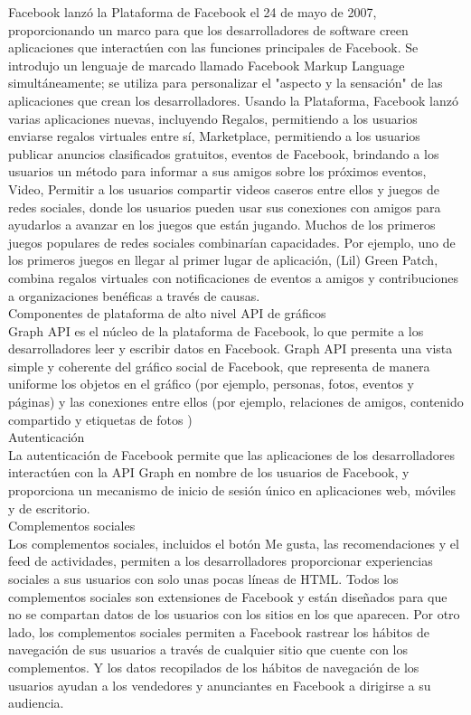 \begin{itemize}
		Facebook lanzó la Plataforma de Facebook el 24 de mayo de 2007, proporcionando un marco para que los desarrolladores de software creen aplicaciones que interactúen con las funciones principales de Facebook. Se introdujo un lenguaje de marcado llamado Facebook Markup Language simultáneamente; se utiliza para personalizar el "aspecto y la sensación" de las aplicaciones que crean los desarrolladores. Usando la Plataforma, Facebook lanzó varias aplicaciones nuevas, incluyendo Regalos, permitiendo a los usuarios enviarse regalos virtuales entre sí, Marketplace, permitiendo a los usuarios publicar anuncios clasificados gratuitos, eventos de Facebook, brindando a los usuarios un método para informar a sus amigos sobre los próximos eventos, Video, Permitir a los usuarios compartir videos caseros entre ellos y juegos de redes sociales, donde los usuarios pueden usar sus conexiones con amigos para ayudarlos a avanzar en los juegos que están jugando. Muchos de los primeros juegos populares de redes sociales combinarían capacidades. Por ejemplo, uno de los primeros juegos en llegar al primer lugar de aplicación, (Lil) Green Patch, combina regalos virtuales con notificaciones de eventos a amigos y contribuciones a organizaciones benéficas a través de causas. \\
		
		Componentes de plataforma de alto nivel
		API de gráficos\\
		Graph API es el núcleo de la plataforma de Facebook, lo que permite a los desarrolladores leer y escribir datos en Facebook. Graph API presenta una vista simple y coherente del gráfico social de Facebook, que representa de manera uniforme los objetos en el gráfico (por ejemplo, personas, fotos, eventos y páginas) y las conexiones entre ellos (por ejemplo, relaciones de amigos, contenido compartido y etiquetas de fotos )\\
		
		Autenticación\\
		La autenticación de Facebook permite que las aplicaciones de los desarrolladores interactúen con la API Graph en nombre de los usuarios de Facebook, y proporciona un mecanismo de inicio de sesión único en aplicaciones web, móviles y de escritorio.\\
		
		Complementos sociales\\
		Los complementos sociales, incluidos el botón Me gusta, las recomendaciones y el feed de actividades, permiten a los desarrolladores proporcionar experiencias sociales a sus usuarios con solo unas pocas líneas de HTML. Todos los complementos sociales son extensiones de Facebook y están diseñados para que no se compartan datos de los usuarios con los sitios en los que aparecen. Por otro lado, los complementos sociales permiten a Facebook rastrear los hábitos de navegación de sus usuarios a través de cualquier sitio que cuente con los complementos. Y los datos recopilados de los hábitos de navegación de los usuarios ayudan a los vendedores y anunciantes en Facebook a dirigirse a su audiencia.\\
		

\end{itemize}
